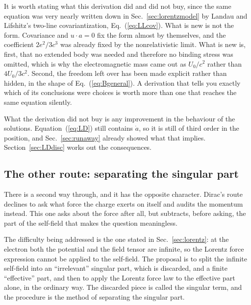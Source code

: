 \documentclass[preprint]{aastex701}
\begin{document}
It is worth stating what this derivation did and did not buy, since the same
equation was very nearly written down in Sec.~\ref{sec:lorentzmodel} by
Landau and Lifshitz's two-line covariantization, Eq.~(\ref{eq:LLcov}). What is
new is not the form. Covariance and $u\cdot a = 0$ fix the form almost by
themselves, and the coefficient $2e^2/3c^3$ was already fixed by the
nonrelativistic limit. What is new is, first, that no extended body was needed
and therefore no binding stress was omitted, which is why the electromagnetic
mass came out as $U_0/c^2$ rather than $4U_0/3c^2$. Second, the freedom left
over has been made explicit rather than hidden, in the shape of
Eq.~(\ref{eq:Bgeneral}). A derivation that tells you exactly which of its
conclusions were choices is worth more than one that reaches the same equation
silently.

What the derivation did not buy is any improvement in the behaviour of the
solutions. Equation~(\ref{eq:LD}) still contains $\dot a$, so it is still of
third order in the position, and Sec.~\ref{sec:runaway} already showed what that
implies. Section~\ref{sec:LDdisc} works out the consequences.

\subsection{The other route: separating the singular part}
\label{sec:sepsing}



There is a second way through, and it has the opposite character. Dirac's route
declines to ask what force the charge exerts on itself and audits the momentum
instead. This one asks about the force after all, but subtracts, before asking,
the part of the self-field that makes the question meaningless.

The difficulty being addressed is the one stated in Sec.~\ref{sec:lorentz}: at
the electron both the potential and the field tensor are infinite, so the
Lorentz force expression cannot be applied to the self-field. The proposal is to
split the infinite self-field into an ``irrelevant'' singular part, which is
discarded, and a finite ``effective'' part, and then to apply the Lorentz force
law to the effective part alone, in the ordinary way. The discarded piece is
called the singular term, and the procedure is the method of separating the
singular part.
\end{document}
